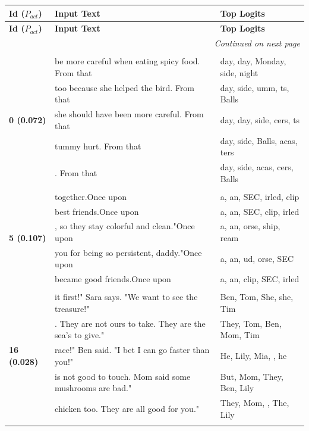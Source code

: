 \documentclass{article}
\theoremstyle{plain}
\theoremstyle{definition}
\theoremstyle{remark}
\begin{document}
\small
\begin{longtable}{|p{}|p{}|p{}|}
\hline
\textbf{Id ($P_{act}$)} & \textbf{Input Text} & \textbf{Top Logits} \\
\hline
\endfirsthead  %
\hline
\textbf{Id ($P_{act}$)} & \textbf{Input Text} & \textbf{Top Logits} \\
\hline
\endhead

\hline
\multicolumn{3}{r}{\textit{Continued on next page}} \\
\hline
\endfoot

\hline
\endlastfoot
& & \\
\multirow{5}{*}{\textbf{0 (0.072)}} & be more careful when eating spicy food. From that & day, day,  Monday, side, night \\
& too because she helped the bird. From that & day, side, umm, ts,  Balls \\
& she should have been more careful. From that & day, day, side, cers, ts \\
& tummy hurt. From that & day, side,  Balls, acas, ters \\
& . From that & day, side, acas, cers,  Balls \\
& & \\
\multirow{5}{*}{\textbf{5 (0.107)}} & together.Once upon & a,  an, SEC, irled, clip \\
& best friends.Once upon & a,  an, SEC, clip, irled \\
& , so they stay colorful and clean."Once upon & a,  an, orse, ship, ream \\
& you for being so persistent, daddy."Once upon & a,  an, ud, orse, SEC \\
& became good friends.Once upon & a,  an, clip, SEC, irled \\
& & \\
\multirow{5}{*}{\textbf{16 (0.028)}} & it first!" Sara says. "We want to see the treasure!" & Ben,  Tom,  She,  she,  Tim \\
& . They are not ours to take. They are the sea's to give." & They,  Tom,  Ben,  Mom,  Tim \\
& race!" Ben said. "I bet I can go faster than you!" & He,  Lily,  Mia,  ,  he \\
& is not good to touch. Mom said some mushrooms are bad." & But,  Mom,  They,  Ben,  Lily \\
& chicken too. They are all good for you." & They,  Mom,  ,  The,  Lily \\
& & \\

\end{longtable}
\end{document}
